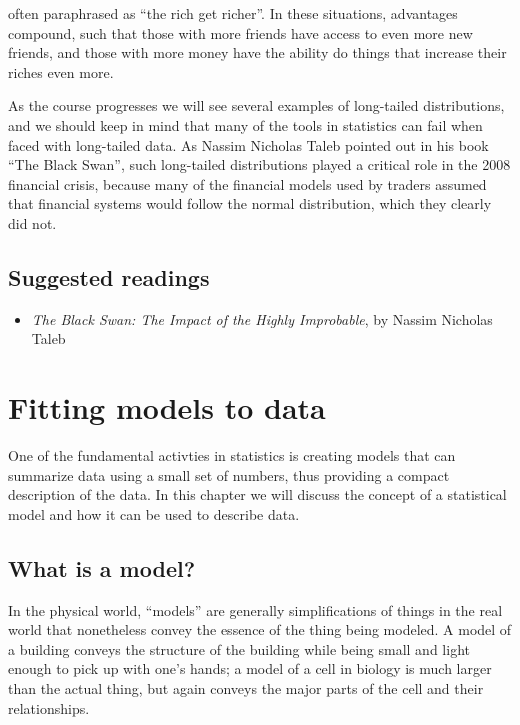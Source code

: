 \documentclass[]{book}
\providecommand{\tightlist}{%
  \setlength{\itemsep}{0pt}\setlength{\parskip}{0pt}}
\theoremstyle{definition}
\theoremstyle{definition}
\theoremstyle{definition}
\theoremstyle{remark}
\begin{document}
often paraphrased as ``the rich get richer''. In these situations,
advantages compound, such that those with more friends have access to
even more new friends, and those with more money have the ability do
things that increase their riches even more.

As the course progresses we will see several examples of long-tailed
distributions, and we should keep in mind that many of the tools in
statistics can fail when faced with long-tailed data. As Nassim Nicholas
Taleb pointed out in his book ``The Black Swan'', such long-tailed
distributions played a critical role in the 2008 financial crisis,
because many of the financial models used by traders assumed that
financial systems would follow the normal distribution, which they
clearly did not.

\section{Suggested readings}\label{suggested-readings-3}

\begin{itemize}
\tightlist
\item
  \emph{The Black Swan: The Impact of the Highly Improbable}, by Nassim
  Nicholas Taleb
\end{itemize}

\chapter{Fitting models to data}\label{fitting-models-to-data}

One of the fundamental activties in statistics is creating models that
can summarize data using a small set of numbers, thus providing a
compact description of the data. In this chapter we will discuss the
concept of a statistical model and how it can be used to describe data.

\section{What is a model?}\label{what-is-a-model}

In the physical world, ``models'' are generally simplifications of
things in the real world that nonetheless convey the essence of the
thing being modeled. A model of a building conveys the structure of the
building while being small and light enough to pick up with one's hands;
a model of a cell in biology is much larger than the actual thing, but
again conveys the major parts of the cell and their relationships.
\end{document}

